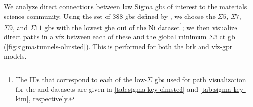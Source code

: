 \documentclass[final,twocolumn,12pt]{elsarticle}
\begin{document}
	We analyze direct connections between low Sigma \glspl{gb} of interest to the materials science community. Using the set of 388 \glspl{gb} defined by \citet{olmstedSurveyComputedGrain2009}, we choose the $\Sigma5$, $\Sigma7$, $\Sigma9$, and $\Sigma11$ \glspl{gb} with the lowest \gls{gbe} out of the \citet{olmstedSurveyComputedGrain2009} Ni dataset\footnote{The IDs that correspond to each of the low-$\Sigma$ \glspl{gb} used for path visualization for the \citet{olmstedSurveyComputedGrain2009} and \citet{kimPhasefieldModeling3D2014} datasets are given in \cref{tab:sigma-key-olmsted} and \cref{tab:sigma-key-kim}, respectively. }; we then visualize direct paths in a \gls{vfz} between each of these and the global minimum $\Sigma3$ \gls{ct} \gls{gb} (\cref{fig:sigma-tunnels-olmsted}). This is performed for both the \gls{brk} and \gls{vfz}-\gls{gpr} models.
	
		
\end{document}

